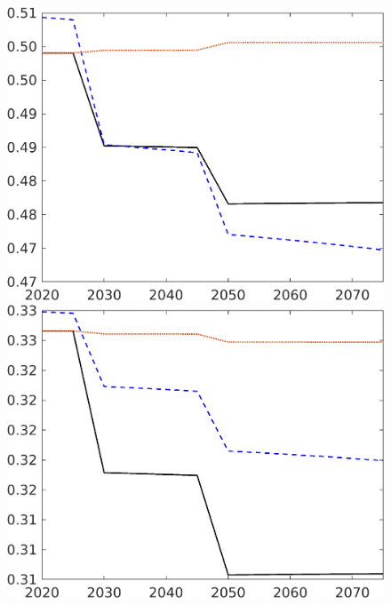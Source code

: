 \begin{figure}[h!!]
\begin{minipage}[]{0.32\textwidth}
		\includegraphics[width=1\textwidth]{../../codding_model/own_basedOnFried/optimalPol_elastS_DisuSci/figures/all_1705/hh_CompEffOPT_T_NoTaus_spillover0_sep1_BN0_ineq0_red0_etaa0.79_lgd0.png}
	\end{minipage}
	\begin{minipage}[]{0.32\textwidth}
		\includegraphics[width=1\textwidth]{../../codding_model/own_basedOnFried/optimalPol_elastS_DisuSci/figures/all_1705/hl_CompEffOPT_T_NoTaus_spillover0_sep1_BN0_ineq0_red0_etaa0.79_lgd0.png}
	\end{minipage}
	\begin{minipage}[]{0.32\textwidth}

\end{minipage}
\end{figure}
